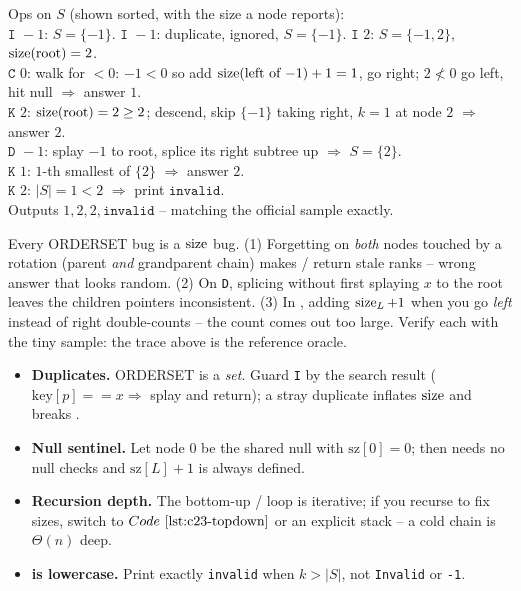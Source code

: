 \begin{tracebox}
Ops on \(S\) (shown sorted, with the size a node reports):\\
\(\texttt{I }-1\): \(S=\{-1\}\). \(\texttt{I }-1\): duplicate, ignored, \(S=\{-1\}\).
\(\texttt{I }2\): \(S=\{-1,2\}\), \(\operatorname{size}(\text{root})=2\).\\
\(\texttt{C }0\): walk for \(<0\): \(-1<0\) so add \(\operatorname{size}(\text{left of }{-1})+1=1\),
go right; \(2\not<0\) go left, hit null \(\Rightarrow\) answer \(\boxed{1}\).\\
\(\texttt{K }2\): \(\operatorname{size}(\text{root})=2\ge2\); descend, skip \(\{-1\}\) taking right,
\(k=1\) at node \(2\) \(\Rightarrow\) answer \(\boxed{2}\).\\
\(\texttt{D }-1\): splay \(-1\) to root, splice its right subtree up \(\Rightarrow\)
\(S=\{2\}\).\\
\(\texttt{K }1\): \(1\)-th smallest of \(\{2\}\) \(\Rightarrow\) answer \(\boxed{2}\).\\
\(\texttt{K }2\): \(|S|=1<2\) \(\Rightarrow\) print \(\boxed{\texttt{invalid}}\).\\
Outputs \(1,2,2,\texttt{invalid}\) -- matching the official sample exactly.
\end{tracebox}

\begin{warningbox}
Every ORDERSET bug is a \(\operatorname{size}\) bug. (1) Forgetting  on \emph{both}
nodes touched by a rotation (parent \emph{and} grandparent chain) makes
/ return stale ranks -- wrong answer that looks random. (2) On
\texttt{D}, splicing without first splaying \(x\) to the root leaves the children
pointers inconsistent. (3) In , adding \(\operatorname{size}_L+1\) when you go
\emph{left} instead of right double-counts -- the count comes out too large. Verify
each with the tiny sample: the trace above is the reference oracle.
\end{warningbox}

\begin{hardeningbox}
\begin{itemize}[nosep,leftmargin=1.4em]
  \item \textbf{Duplicates.} ORDERSET is a \emph{set}. Guard \texttt{I} by the
        search result (\(\text{key}[p]==x \Rightarrow\) splay and return); a stray
        duplicate inflates \(\operatorname{size}\) and breaks .
  \item \textbf{Null sentinel.} Let node \(0\) be the shared null with
        \(\text{sz}[0]=0\); then  needs no null checks and
        \(\text{sz}[L]+1\) is always defined.
  \item \textbf{Recursion depth.} The bottom-up / loop is
        iterative; if you recurse to fix sizes, switch to \(\coderef{c23-topdown}\)
        or an explicit stack -- a cold chain is \(\Theta(n)\) deep.
  \item \textbf{ is lowercase.} Print exactly \texttt{invalid} when
        \(k>|S|\), not \texttt{Invalid} or \texttt{-1}.
\end{itemize}
\end{hardeningbox}

